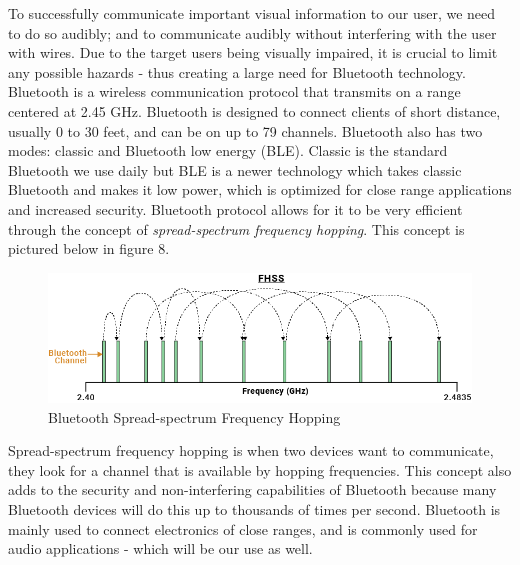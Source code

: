 \noindent To successfully communicate important visual information to our user, we need to do so audibly; and to communicate audibly without interfering with the user with wires. Due to the target users being visually impaired, it is crucial to limit any possible hazards - thus creating a large need for Bluetooth technology. Bluetooth is a wireless communication protocol that transmits on a range centered at 2.45 GHz. Bluetooth is designed to connect clients of short distance, usually 0 to 30 feet, and can be on up to 79 channels. Bluetooth \cite{bluetoothHow} also has two modes: classic and Bluetooth low energy (BLE). Classic is the standard Bluetooth we use daily but BLE is a newer technology which takes classic Bluetooth and makes it low power, which is optimized for close range applications and increased security. Bluetooth protocol allows for it to be very efficient through the concept of \textit{spread-spectrum frequency hopping}. This concept is pictured below in figure 8. \\

\begin{figure}[H]
	\centering
	\includegraphics[width=1\textwidth]{./Images/bluetooth-freq-hop.png}
	\caption{\label{fig:bluetooth-freq-hop}Bluetooth Spread-spectrum Frequency Hopping}
\end{figure}

\noindent  Spread-spectrum frequency hopping is when two devices want to communicate, they look for a channel that is available by hopping frequencies. This concept also adds to the security and non-interfering capabilities of Bluetooth because many Bluetooth devices will do this up to thousands of times per second. Bluetooth is mainly used to connect electronics of close ranges, and is commonly used for audio applications - which will be our use as well. \\


